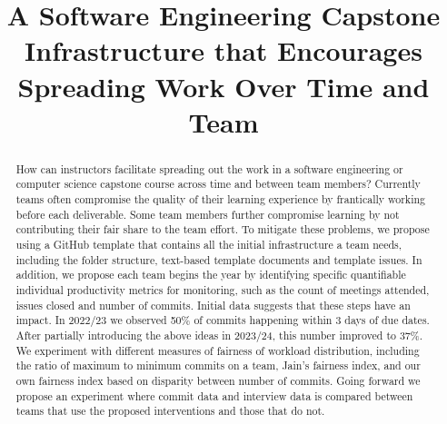 \documentclass[10pt, conference]{IEEEtran}
\begin{document}
\title{A Software Engineering Capstone Infrastructure that Encourages Spreading
Work Over Time and Team}

\author{\IEEEauthorblockN{}
\IEEEauthorblockA{}


}

\maketitle
  
\begin{abstract}

How can instructors facilitate spreading out the work in a software engineering
or computer science capstone course across time and between team members?
Currently teams often compromise the quality of their learning experience by
frantically working before each deliverable.  Some team members further
compromise learning by not contributing their fair share to the team effort. To
mitigate these problems, we propose using a GitHub template that contains all
the initial infrastructure a team needs, including the folder structure,
text-based template documents and template issues. In addition, we propose each
team begins the year by identifying specific quantifiable individual
productivity metrics for monitoring, such as the count of meetings attended,
issues closed and number of commits.  Initial data suggests that these steps
have an impact.  In 2022/23 we observed 50\% of commits happening within 3 days
of due dates.  After partially introducing the above ideas in 2023/24, this
number improved to 37\%. We experiment with different measures of fairness of
workload distribution, including the ratio of maximum to minimum commits on a
team, Jain's fairness index, and our own fairness index based on disparity
between number of commits. Going forward we propose an experiment where commit
data and interview data is compared between teams that use the proposed
interventions and those that do not.

\end{abstract}
\end{document}
